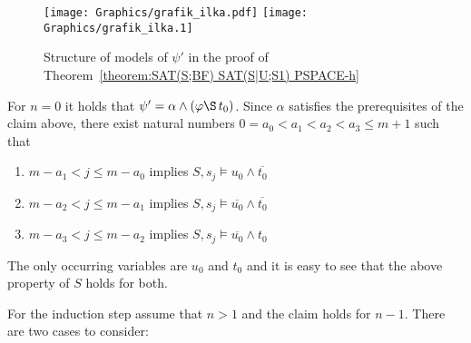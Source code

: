 \begin{figure}
\begin{center}
  \ifpdf
    \texttt{[image: Graphics/grafik\_ilka.pdf]}
  \else
    \texttt{[image: Graphics/grafik\_ilka.1]}
  \fi
\caption{Structure of models of $\psi'$ in the proof of Theorem~\ref{theorem:SAT(S;BF) SAT(S|U;S1) PSPACE-h}}\label{figure: structure}
\end{center}
\end{figure}



        For $n=0$ it holds that $\psi'=\alpha\wedge(\varphi\S \,t_0)$. Since $\alpha$ satisfies the prerequisites of the claim above, there exist natural numbers $0=a_0<a_1<a_2<a_3\leq m+1$ such that
        \begin{enumerate}[$\bullet$]
\item $m-a_1< j\leq m-a_0$ implies $S,s_j\vDash u_0\wedge\overline{t_0}$
          \item $m-a_2< j\leq m-a_1$ implies $S,s_j\vDash \overline{u_0}\wedge\overline{t_0}$
	  \item $m-a_3< j\leq m-a_2$ implies $S,s_j\vDash \overline{u_0}\wedge t_0$
        \end{enumerate}
        The only occurring variables are $u_0$ and $t_0$ and it is easy to see that the above property of $S$ holds for both.

        For the induction step assume that $n>1$ and the claim holds for $n-1$. There are two cases to consider:

